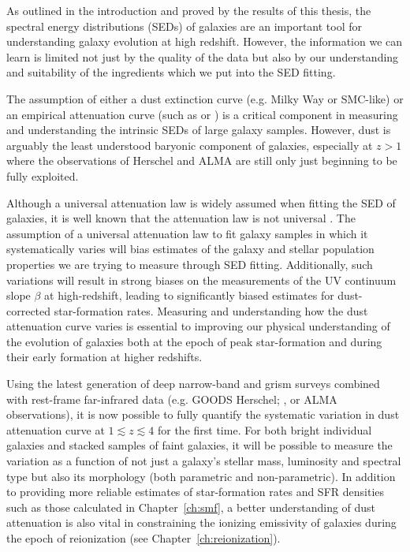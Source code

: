 As outlined in the introduction and proved by the results of this thesis, the spectral energy distributions (SEDs) of galaxies are an important tool for understanding galaxy evolution at high redshift. However, the information we can learn is limited not just by the quality of the data but also by our understanding and suitability of the ingredients which we put into the SED fitting.

The assumption of either a dust extinction curve (e.g. Milky Way or SMC-like) or an empirical attenuation curve (such as \citet{2000ApJ...533..682C} or \citet{2000ApJ...539..718C}) is a critical component in measuring and understanding the intrinsic SEDs of large galaxy samples. However, dust is arguably the least understood baryonic component of galaxies, especially at $z > 1$ where the observations of Herschel and ALMA are still only just beginning to be fully exploited. 

Although a universal attenuation law is widely assumed when fitting the SED of galaxies, it is well known that the attenuation law is not universal \citep{Buat:2012ku,Kriek:2013kx}. The assumption of a universal attenuation law to fit galaxy samples in which it systematically varies will bias estimates of the galaxy and stellar population properties we are trying to measure through SED fitting. Additionally, such variations will result in strong biases on the measurements of the UV continuum slope $\beta$ at high-redshift, leading to significantly biased estimates for dust-corrected star-formation rates. Measuring and understanding how the dust attenuation curve varies is essential to improving our physical understanding of the evolution of galaxies both at the epoch of peak star-formation and during their early formation at higher redshifts.

Using the latest generation of deep narrow-band \citep{PerezGonzalez:2012fo} and grism surveys \citep{Brammer:2012bu} combined with rest-frame far-infrared data (e.g. GOODS Herschel; \citet{Elbaz:2011ix}, or ALMA observations), it is now possible to fully quantify the systematic variation in dust attenuation curve at $1 \lesssim z \lesssim 4$ for the first time. For both bright individual galaxies and stacked samples of faint galaxies, it will be possible to measure the variation as a function of not just a galaxy’s stellar mass, luminosity and spectral type but also its morphology (both parametric and non-parametric). In addition to providing more reliable estimates of star-formation rates and SFR densities such as those calculated in Chapter~\ref{ch:smf}, a better understanding of dust attenuation is also vital in constraining the ionizing emissivity of galaxies during the epoch of reionization (see Chapter~\ref{ch:reionization}).

